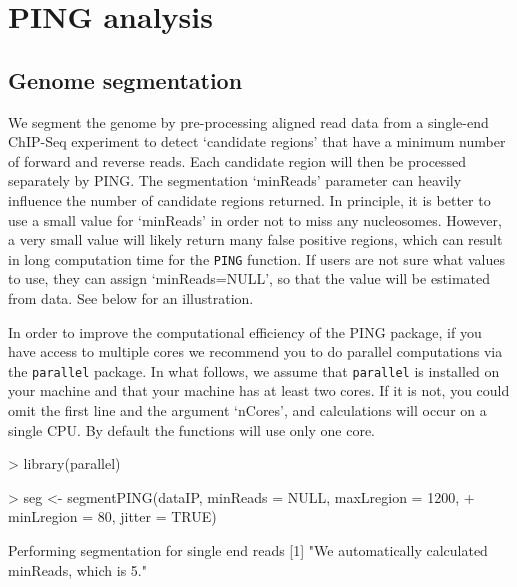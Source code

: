 \documentclass[11pt]{article}
\begin{document}


\section{PING analysis}

\subsection{Genome segmentation}
We segment the genome by pre-processing aligned read data from a single-end ChIP-Seq experiment to detect `candidate regions' that have a minimum number of forward and reverse reads. Each candidate region will then be processed separately by PING. The segmentation `minReads' parameter can heavily influence the number of candidate regions returned. In principle, it is better to use a small value for `minReads' in order not to miss any nucleosomes. However, a very small value will likely return many false positive regions, which can result in long computation time for the \texttt{PING} function. If users are not sure what values to use, they can assign `minReads=NULL', so that the value will be estimated from data. See below for an illustration.


In order to improve the computational efficiency of the PING package, if you have access to multiple cores we recommend you to do parallel computations via the \texttt{parallel} package. In what follows, we assume that \texttt{parallel} is installed on your machine and that your machine has at least two cores. If it is not, you could omit the first line and the argument `nCores', and calculations will occur on a single CPU.
By default the functions will use only one core.

\begin{Schunk}
\begin{Sinput}
> library(parallel)
\end{Sinput}
\end{Schunk}


\begin{Schunk}
\begin{Sinput}
> seg <- segmentPING(dataIP, minReads = NULL, maxLregion = 1200, 
+     minLregion = 80, jitter = TRUE)
\end{Sinput}
\begin{Soutput}
Performing segmentation for single end reads
[1] "We automatically calculated minReads, which is 5."
\end{Soutput}
\end{Schunk}
\end{document}

